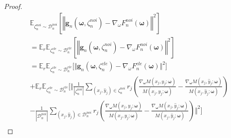 \begin{proof}
\begin{multline}\label{eq:proof-b-v2}
    \mathbb{E}_{\zeta_n^{noi}\sim \mathcal{D}_n^{noi}}\left[\left\Vert \boldsymbol{g}_n\left(\boldsymbol{\omega},\zeta_n^{noi}\right) - \nabla_\omega  F_n^{noi}\left(\boldsymbol{\omega}\right) \right\Vert^2 \right]\\
=\mathbb{E}_{r}\mathbb{E}_{\zeta_n^{cle}\sim \mathcal{D}_n^{cle}}\left[\left\Vert \boldsymbol{g}_n\left(\boldsymbol{\omega},\zeta_n^{noi}\right) - \nabla_\omega  F_n^{noi}\left(\boldsymbol{\omega}\right) \right\Vert^2 \right]\\    
=\mathbb{E}_{r}\mathbb{E}_{\zeta_n^{cle}\sim \mathcal{D}_n^{cle}}\Biggl[\Vert\boldsymbol{g}_n\left(\boldsymbol{\omega},\zeta_n^{cle}\right)-\nabla_\omega  F_n^{cle}\left(\boldsymbol{\omega}\right)\Vert^2\Biggl]\\
    +\mathbb{E}_{r}\mathbb{E}_{\zeta_n^{cle}\sim \mathcal{D}_n^{cle}}\Biggl[\Vert\frac{1}{|\zeta_n^{noi}|}\sum_{\left(x_j,\hat{y}_j\right)\in \zeta_n^{noi}}r_j\left(\frac{\nabla_{\boldsymbol{\omega}} M\left(x_j, y_j; \boldsymbol{\omega}\right)}{M\left(x_j, y_j; \boldsymbol{\omega}\right)} -\frac{\nabla_{\boldsymbol{\omega}} M\left(x_j, \hat{y}_j; \boldsymbol{\omega}\right)}{M\left(x_j, \hat{y}_j; \boldsymbol{\omega}\right)}\right)\\
    -\frac{1}{|\mathcal{D}_n^{noi}|}\sum_{\left(x_j,\hat{y}_j\right)\in \mathcal{D}_n^{noi}}r_j\left(\frac{\nabla_{\boldsymbol{\omega}} M\left(x_j, y_j; \boldsymbol{\omega}\right)}{M\left(x_j, y_j; \boldsymbol{\omega}\right)} -\frac{\nabla_{\boldsymbol{\omega}} M\left(x_j, \hat{y}_j; \boldsymbol{\omega}\right)}{M\left(x_j, \hat{y}_j; \boldsymbol{\omega}\right)}\right)\Vert^2\Biggl]\\

\end{multline}
\end{proof}
